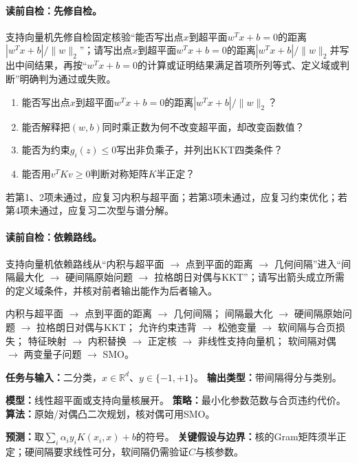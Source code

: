 \label{struct:V3-C02-CH03}
\paragraph{读前自检：先修自检。}支持向量机先修自检固定核验“能否写出点$x$到超平面$w^Tx+b=0$的距离$|w^Tx+b|/\lVert w\rVert_2$”；请写出点$x$到超平面$w^Tx+b=0$的距离$|w^Tx+b|/\lVert w\rVert_2$并写出中间结果，再按“$w^Tx+b=0$的计算或证明结果满足首项所列等式、定义域或判断”明确判为通过或失败。\par

\begin{precheckbox}
\begin{enumerate}[leftmargin=2.2em]
  \item 能否写出点$x$到超平面$w^Tx+b=0$的距离$|w^Tx+b|/\lVert w\rVert_2$？
  \item 能否解释把$(w,b)$同时乘正数为何不改变超平面，却改变函数值？
  \item 能否为约束$g_i(z)\leq0$写出非负乘子，并列出KKT四类条件？
  \item 能否用$v^TKv\geq0$判断对称矩阵$K$半正定？
\end{enumerate}
若第1、2项未通过，应复习内积与超平面；若第3项未通过，应复习约束优化；若第4项未通过，应复习二次型与谱分解。
\end{precheckbox}

\label{struct:V3-C02-CH04}
\paragraph{读前自检：依赖路线。}支持向量机依赖路线从“内积与超平面 $\to$ 点到平面的距离 $\to$ 几何间隔”进入“间隔最大化 $\to$ 硬间隔原始问题 $\to$ 拉格朗日对偶与KKT”；请写出箭头成立所需的定义域条件，并核对前者输出能作为后者输入。\par

\begin{dependencybox}
内积与超平面 $\to$ 点到平面的距离 $\to$ 几何间隔；
间隔最大化 $\to$ 硬间隔原始问题 $\to$ 拉格朗日对偶与KKT；
允许约束违背 $\to$ 松弛变量 $\to$ 软间隔与合页损失；
特征映射 $\to$ 内积替换 $\to$ 正定核 $\to$ 非线性支持向量机；
软间隔对偶 $\to$ 两变量子问题 $\to$ SMO。
\end{dependencybox}

\begin{keypointbox}[title=模型认识卡：支持向量机]
\textbf{任务与输入：}二分类，$x\in\mathbb R^d$、$y\in\{-1,+1\}$。\quad
\textbf{输出类型：}带间隔得分与类别。\par
\textbf{模型：}线性超平面或支持向量核展开。\quad
\textbf{策略：}最小化参数范数与合页违约代价。\quad
\textbf{算法：}原始/对偶凸二次规划，核对偶可用SMO。\par
\textbf{预测：}取$\sum_i\alpha_i y_iK(x_i,x)+b$的符号。\quad
\textbf{关键假设与边界：}核的Gram矩阵须半正定；硬间隔要求线性可分，软间隔仍需验证$C$与核参数。
\end{keypointbox}

